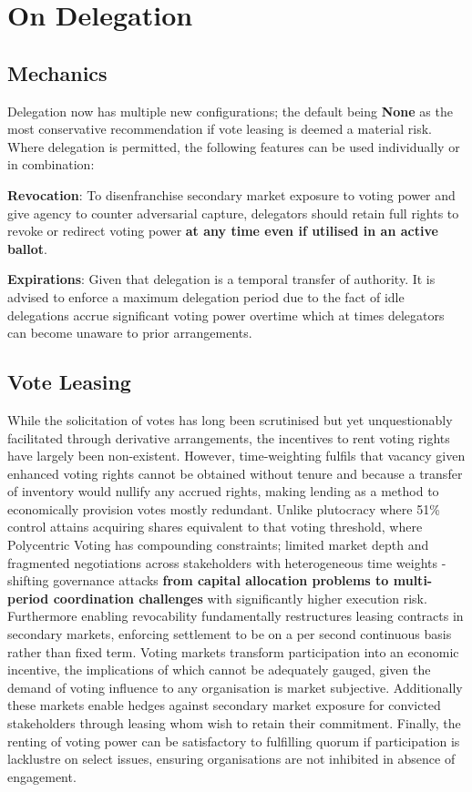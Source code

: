 \documentclass[a4paper,12pt]{article}
\begin{document}
\section{\signifier On Delegation} 

\subsection{\signifier Mechanics}

Delegation now has multiple new configurations; the default being \textbf{None} as the most conservative recommendation if vote leasing is deemed a material risk. Where delegation is permitted, the following features can be used individually or in combination:

\noindent\textbf{Revocation}: To disenfranchise secondary market exposure to voting power and give agency to counter adversarial capture, delegators should retain full rights to revoke or redirect voting power \textbf{at any time even if utilised in an active ballot}.

\noindent\textbf{Expirations}: Given that delegation is a temporal transfer of authority. It is advised to enforce a maximum delegation period due to the fact of idle delegations accrue significant voting power overtime which at times delegators can become unaware to prior arrangements. 

\subsection{\signifier Vote Leasing}

While the solicitation of votes has long been scrutinised but yet unquestionably facilitated through derivative arrangements, the incentives to rent voting rights have largely been non-existent. However, time-weighting fulfils that vacancy given enhanced voting rights cannot be obtained without tenure and because a transfer of inventory would nullify any accrued rights, making lending as a method to economically provision votes mostly redundant. Unlike plutocracy where 51\% control attains acquiring shares equivalent to that voting threshold, where Polycentric Voting has compounding constraints; limited market depth and fragmented negotiations across stakeholders with heterogeneous time weights - shifting governance attacks \textbf{from capital allocation problems to multi-period coordination challenges} with significantly higher execution risk. Furthermore enabling revocability fundamentally restructures leasing contracts in secondary markets, enforcing settlement to be on a per second continuous basis rather than fixed term. Voting markets transform participation into an economic incentive, the implications of which cannot be adequately gauged, given the demand of voting influence to any organisation is market subjective. Additionally these markets enable hedges against secondary market exposure for convicted stakeholders through leasing whom wish to retain their commitment. Finally, the renting of voting power can be satisfactory to fulfilling quorum if participation is lacklustre on select issues, ensuring organisations are not inhibited in absence of engagement.
\end{document}
